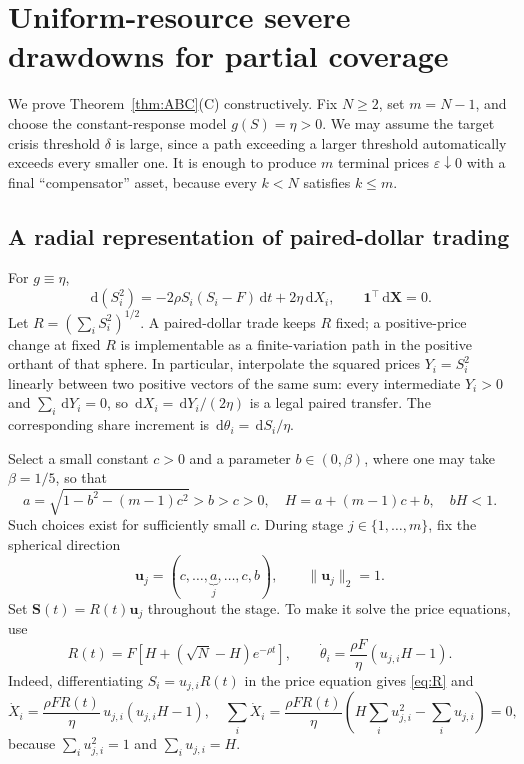 \documentclass[11pt]{article}
\numberwithin{equation}{section}
\theoremstyle{definition}
\theoremstyle{remark}
\newcommand{\dd}{\,\mathrm{d}}
\newcommand{\one}{\mathbf{1}}
\begin{document}
\section{Uniform-resource severe drawdowns for partial coverage}\label{app:severe}
We prove Theorem~\ref{thm:ABC}(C) constructively. Fix $N\ge2$, set $m=N-1$, and choose the constant-response model $g(S)=\eta>0$. We may assume the target crisis threshold $\delta$ is large, since a path exceeding a larger threshold automatically exceeds every smaller one. It is enough to produce $m$ terminal prices $\varepsilon\downarrow0$ with a final ``compensator'' asset, because every $k<N$ satisfies $k\le m$.

\subsection{A radial representation of paired-dollar trading}
For $g\equiv\eta$,
\begin{equation}\label{eq:radius-appendix}
\dd(S_i^2)= -2\rho S_i(S_i-F)\dd t+2\eta\dd X_i,
\qquad \one^\top\dd\bm X=0.
\end{equation}
Let $R=(\sum_iS_i^2)^{1/2}$. A paired-dollar trade keeps $R$ fixed; a positive-price change at fixed $R$ is implementable as a finite-variation path in the positive orthant of that sphere. In particular, interpolate the squared prices $Y_i=S_i^2$ linearly between two positive vectors of the same sum: every intermediate $Y_i>0$ and $\sum_i\dd Y_i=0$, so $\dd X_i=\dd Y_i/(2\eta)$ is a legal paired transfer. The corresponding share increment is $\dd\theta_i=\dd S_i/\eta$.

Select a small constant $c>0$ and a parameter $b\in(0,\beta)$, where one may take $\beta=1/5$, so that
\begin{equation}\label{eq:abcs}
a=\sqrt{1-b^2-(m-1)c^2}>b>c>0,
\quad
H=a+(m-1)c+b,
\quad bH<1.
\end{equation}
Such choices exist for sufficiently small $c$. During stage $j\in\{1,\dots,m\}$, fix the spherical direction
\begin{equation}\label{eq:uj}
\bm u_j=(c,\ldots,\underbrace{a}_{j},\ldots,c,b),
\qquad \|\bm u_j\|_2=1.
\end{equation}
Set $\bm S(t)=R(t)\bm u_j$ throughout the stage. To make it solve the price equations, use
\begin{equation}\label{eq:R}
R(t)=F\left[H+(\sqrt N-H)e^{-\rho t}\right],
\qquad
\dot\theta_i=\frac{\rho F}{\eta}\left(u_{j,i}H-1\right).
\end{equation}
Indeed, differentiating $S_i=u_{j,i}R(t)$ in the price equation gives \eqref{eq:R} and
\begin{equation}\label{eq:dXdt}
\dot X_i=\frac{\rho FR(t)}\eta\,u_{j,i}(u_{j,i}H-1),
\quad \sum_i\dot X_i=\frac{\rho FR(t)}\eta\left(H\sum_i u_{j,i}^2-\sum_i u_{j,i}\right)=0,
\end{equation}
because $\sum_i u_{j,i}^2=1$ and $\sum_i u_{j,i}=H$.
\end{document}
